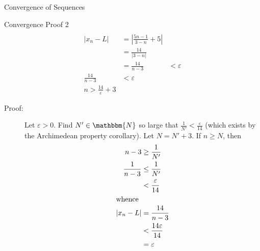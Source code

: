 \documentclass[10pt]{extarticle}
\newcommand{\N}{\mathbbm{N}}
\begin{document}
\begin{problem}{Convergence of Sequences}
\begin{problem}{Convergence Proof 2}
\begin{align*}
      \end{align*}
      \tcblower
      \begin{align*}
        |x_n - L| &= \left|\frac{5n-1}{3-n} + 5\right|\\
                  &= \frac{14}{|3-n|}\\
                  &= \frac{14}{n-3}
                  &< \varepsilon\\
        \frac{14}{n-3} &< \varepsilon\\
        n > \frac{14}{\varepsilon} + 3
      \end{align*}
      \begin{description}
        \item[Proof:] Let $\varepsilon > 0$. Find $N' \in\N$ so large that $\frac{1}{N'} < \frac{\varepsilon}{14}$ (which exists by the Archimedean property corollary). Let $N = N' + 3$. If $n \geq N$, then
          \begin{align*}
            n-3 &\geq \frac{1}{N'}\\
            \frac{1}{n-3} &\leq \frac{1}{N'}\\
                          &< \frac{\varepsilon}{14}\\
                          \shortintertext{whence}
            |x_n - L| &= \frac{14}{n-3}\\
                      &< \frac{14\varepsilon}{14}\\
                      &= \varepsilon
          \end{align*}
      \end{description}
    \end{problem}
  \end{problem}
\end{document}
